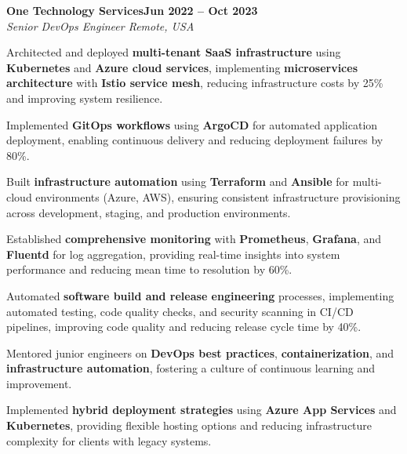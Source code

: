 \documentclass[letterpaper,10pt]{article}
\newcommand{\headingBf}[2]{
  \hspace{10pt}\textbf{#1}\hfill\textbf{#2}\\
}
\newcommand{\headingIt}[2]{
  \hspace{10pt}\textit{#1}\hfill\textit{#2}\\
}
\newenvironment{resume_list}{
  \vspace{-7pt}
  \begin{itemize}[itemsep=-2px, parsep=1pt, leftmargin=30pt]
}{
  \end{itemize}
}
\begin{document}
\headingBf{One Technology Services}{Jun 2022 -- Oct 2023}
\headingIt{Senior DevOps Engineer \hfill Remote, USA}{}
\begin{resume_list}
    \item Architected and deployed \textbf{multi-tenant SaaS infrastructure} using \textbf{Kubernetes} and \textbf{Azure cloud services}, implementing \textbf{microservices architecture} with \textbf{Istio service mesh}, reducing infrastructure costs by 25\% and improving system resilience.
    \item Implemented \textbf{GitOps workflows} using \textbf{ArgoCD} for automated application deployment, enabling continuous delivery and reducing deployment failures by 80\%.
    \item Built \textbf{infrastructure automation} using \textbf{Terraform} and \textbf{Ansible} for multi-cloud environments (Azure, AWS), ensuring consistent infrastructure provisioning across development, staging, and production environments.
    \item Established \textbf{comprehensive monitoring} with \textbf{Prometheus}, \textbf{Grafana}, and \textbf{Fluentd} for log aggregation, providing real-time insights into system performance and reducing mean time to resolution by 60\%.
    \item Automated \textbf{software build and release engineering} processes, implementing automated testing, code quality checks, and security scanning in CI/CD pipelines, improving code quality and reducing release cycle time by 40\%.
    \item Mentored junior engineers on \textbf{DevOps best practices}, \textbf{containerization}, and \textbf{infrastructure automation}, fostering a culture of continuous learning and improvement.
    \item Implemented \textbf{hybrid deployment strategies} using \textbf{Azure App Services} and \textbf{Kubernetes}, providing flexible hosting options and reducing infrastructure complexity for clients with legacy systems.
\end{resume_list}
\end{document}
